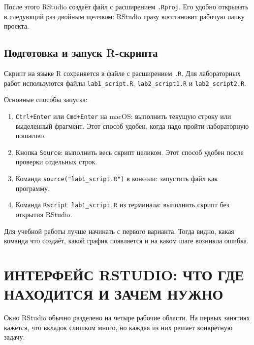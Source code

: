 \documentclass[14pt,a4paper]{extarticle}
\begin{document}
После этого RStudio создаёт файл с расширением \texttt{.Rproj}. Его удобно открывать в следующий раз двойным щелчком: RStudio сразу восстановит рабочую папку проекта.

\subsection{Подготовка и запуск R-скрипта}

Скрипт на языке R сохраняется в файле с расширением \texttt{.R}. Для лабораторных работ используются файлы \texttt{lab1\_script.R}, \texttt{lab2\_script1.R} и \texttt{lab2\_script2.R}.

Основные способы запуска:

\begin{enumerate}[nosep]
  \item \texttt{Ctrl+Enter} или \texttt{Cmd+Enter} на macOS: выполнить текущую строку или выделенный фрагмент. Этот способ удобен, когда надо пройти лабораторную пошагово.
  \item Кнопка \texttt{Source}: выполнить весь скрипт целиком. Этот способ удобен после проверки отдельных строк.
  \item Команда \texttt{source("lab1\_script.R")} в консоли: запустить файл как программу.
  \item Команда \texttt{Rscript lab1\_script.R} из терминала: выполнить скрипт без открытия RStudio.
\end{enumerate}

Для учебной работы лучше начинать с первого варианта. Тогда видно, какая команда что создаёт, какой график появляется и на каком шаге возникла ошибка.

\newpage

\section{ИНТЕРФЕЙС RSTUDIO: ЧТО ГДЕ НАХОДИТСЯ И ЗАЧЕМ НУЖНО}

Окно RStudio обычно разделено на четыре рабочие области. На первых занятиях кажется, что вкладок слишком много, но каждая из них решает конкретную задачу.
\end{document}
